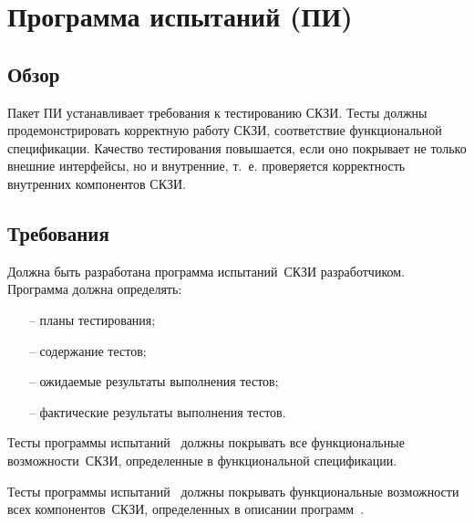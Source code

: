 \section{Программа испытаний (ПИ)}\label{TE}

\subsection{Обзор}\label{TE.Intro}

Пакет ПИ устанавливает требования к тестированию СКЗИ.
%
Тесты должны продемонстрировать корректную работу СКЗИ, 
соответствие функциональной спецификации.
%
Качество тестирования повышается, если оно покрывает не только внешние 
интерфейсы, но и внутренние, т.~е. проверяется корректность внутренних 
компонентов СКЗИ.

\subsection{Требования}\label{TE.Reqs}

\label{R.TE.Prg}
Должна быть разработана программа испытаний~СКЗИ разработчиком.
Программа должна определять:
\begin{itemize}
\item[--]
планы тестирования;
\item[--]
содержание тестов;
\item[--]
ожидаемые результаты выполнения тестов;
\item[--]
фактические результаты выполнения тестов.
\end{itemize}

\label{R.TE.Coverage}
Тесты программы испытаний~ должны 
покрывать все функциональные возможности~СКЗИ, 
определенные в функциональной спецификации.

\label{R.TE.Deep}
Тесты программы испытаний~ должны 
покрывать функциональные возможности всех компонентов~СКЗИ, 
определенных в описании программ~.

